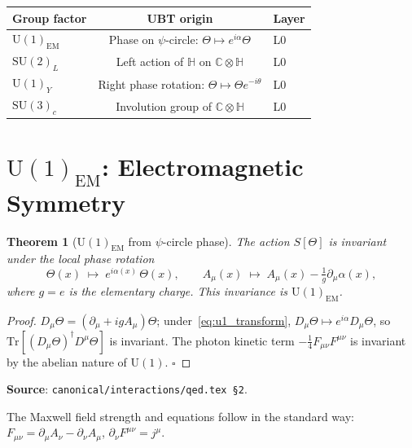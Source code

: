 \documentclass[11pt,a4paper]{article}
\newtheorem{theorem}{Theorem}[section]
\theoremstyle{definition}
\theoremstyle{remark}
\begin{document}
\begin{center}
\begin{tabular}{lcl}
\toprule
Group factor & UBT origin & Layer \\
\midrule
$\mathrm{U}(1)_{\mathrm{EM}}$ & Phase on $\psi$-circle: $\Theta \mapsto e^{i\alpha}\Theta$ & L0 \\
$\mathrm{SU}(2)_L$ & Left action of $\mathbb{H}$ on $\mathbb{C}\otimes\mathbb{H}$ & L0 \\
$\mathrm{U}(1)_Y$ & Right phase rotation: $\Theta \mapsto \Theta e^{-i\theta}$ & L0 \\
$\mathrm{SU}(3)_c$ & Involution group of $\mathbb{C}\otimes\mathbb{H}$ & L0 \\
\bottomrule
\end{tabular}
\end{center}

\section{$\mathrm{U}(1)_{\mathrm{EM}}$: Electromagnetic Symmetry}\label{sec:u1}

\begin{theorem}[$\mathrm{U}(1)_{\mathrm{EM}}$ from $\psi$-circle phase]
\label{thm:u1}
The action $S[\Theta]$ is invariant under the local phase rotation
\begin{equation}\label{eq:u1_transform}
  \Theta(x) \;\mapsto\; e^{i\alpha(x)}\,\Theta(x),
  \qquad A_\mu(x) \;\mapsto\; A_\mu(x) - \tfrac{1}{g}\partial_\mu\alpha(x),
\end{equation}
where $g = e$ is the elementary charge.  This invariance is
$\mathrm{U}(1)_{\mathrm{EM}}$.
\end{theorem}

\begin{proof}
$D_\mu\Theta = (\partial_\mu + igA_\mu)\Theta$; under~\eqref{eq:u1_transform},
$D_\mu\Theta \mapsto e^{i\alpha}D_\mu\Theta$, so
$\mathrm{Tr}[(D_\mu\Theta)^\dagger D^\mu\Theta]$ is invariant.
The photon kinetic term $-\frac14 F_{\mu\nu}F^{\mu\nu}$ is invariant by
the abelian nature of $\mathrm{U}(1)$. $\square$
\end{proof}

\noindent\textbf{Source}: \texttt{canonical/interactions/qed.tex \S2}.

The Maxwell field strength and equations follow in the standard way:
$F_{\mu\nu} = \partial_\mu A_\nu - \partial_\nu A_\mu$,
$\partial_\nu F^{\mu\nu} = j^\mu$.
\end{document}
